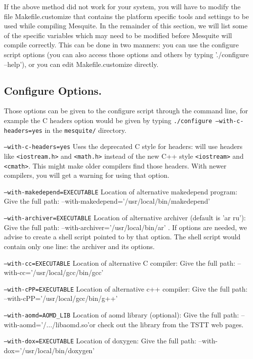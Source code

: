 \documentclass[letter]{report}
\begin{document}
If the above method did not work for your system, you will have to modify the file
Makefile.customize that contains the platform specific tools and settings to be used 
while compiling Mesquite. In the remainder of this section, we
will  list some of the specific variables which
may need to be modified before Mesquite will compile correctly.
This can be done in two manners: you can use the configure
script options (you can also access those options and
others by typing './configure --help'), or you can edit
Makefile.customize directly.

\subsection{Configure Options.}  \label{config_options}

Those options can be given to the configure script through the command line, for example the C headers
option would be given by typing \texttt{./configure --with-c-headers=yes} in the \texttt{mesquite/} directory.

\begin{description}
\item \texttt{--with-c-headers=yes} Uses the deprecated C style for headers:
  will use headers like \texttt{<iostream.h>} and \texttt{<math.h>}
  instead of the new C++ style \texttt{<iostream>} and \texttt{<cmath>}. This might make older
  compilers find those headers. With newer compilers, you will get a warning for using that option.
\item \texttt{--with-makedepend=EXECUTABLE} Location of alternative makedepend program:
Give the full path:  --with-makedepend='/usr/local/bin/makedepend'
\item \texttt{--with-archiver=EXECUTABLE} Location of alternative archiver (default is 'ar ru'):
Give the full path: --with-archiver='/usr/local/bin/ar' . If options are needed, we advise to
create a shell script pointed to by that option. The shell script would contain only one line: the
archiver and its options. 
\item \texttt{--with-cc=EXECUTABLE} Location of alternative C compiler:
Give the full path: --with-cc='/usr/local/gcc/bin/gcc'
\item \texttt{--with-cPP=EXECUTABLE} Location of alternative c++ compiler:
Give the full path:  --with-cPP='/usr/local/gcc/bin/g++'
\item \texttt{--with-aomd=AOMD\_LIB} Location of aomd library (optional):
Give the full path: --with-aomd='/.../libaomd.so'or check out the library from the
TSTT web pages.
\item \texttt{--with-dox=EXECUTABLE} Location of doxygen:
Give the full path: --with-dox='/usr/local/bin/doxygen'
\end{description}
\end{document}
